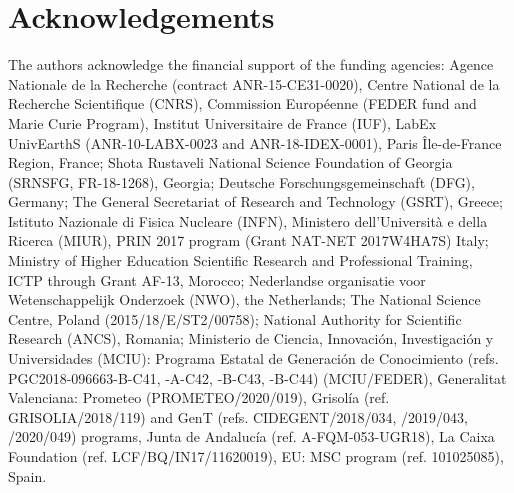 \documentclass[preprint,12pt]{elsarticle}
\begin{document}

\section{Acknowledgements} The authors acknowledge the financial support of the funding agencies: Agence Nationale de la Recherche (contract ANR-15-CE31-0020), Centre National de la Recherche Scientifique (CNRS), Commission Europ\'eenne (FEDER fund and Marie Curie Program), Institut Universitaire de France (IUF), LabEx UnivEarthS (ANR-10-LABX-0023 and ANR-18-IDEX-0001), Paris \^Ile-de-France Region, France; Shota Rustaveli National Science Foundation of Georgia (SRNSFG, FR-18-1268), Georgia; Deutsche Forschungsgemeinschaft (DFG), Germany; The General Secretariat of Research and Technology (GSRT), Greece; Istituto Nazionale di Fisica Nucleare (INFN), Ministero dell'Universit\`a e della Ricerca (MIUR), PRIN 2017 program (Grant NAT-NET 2017W4HA7S) Italy; Ministry of Higher Education Scientific Research and Professional Training, ICTP through Grant AF-13, Morocco; Nederlandse organisatie voor Wetenschappelijk Onderzoek (NWO), the Netherlands; The National Science Centre, Poland (2015/18/E/ST2/00758); National Authority for Scientific Research (ANCS), Romania; Ministerio de Ciencia, Innovaci\'{o}n, Investigaci\'{o}n y Universidades (MCIU): Programa Estatal de Generaci\'{o}n de Conocimiento (refs. PGC2018-096663-B-C41, -A-C42, -B-C43, -B-C44) (MCIU/FEDER), Generalitat Valenciana: Prometeo (PROMETEO/2020/019), Grisol\'{i}a (ref. GRISOLIA/2018/119) and GenT (refs. CIDEGENT/2018/034, /2019/043, /2020/049) programs, Junta de Andaluc\'{i}a (ref. A-FQM-053-UGR18), La Caixa Foundation (ref. LCF/BQ/IN17/11620019), EU: MSC program (ref. 101025085), Spain.



\end{document}
